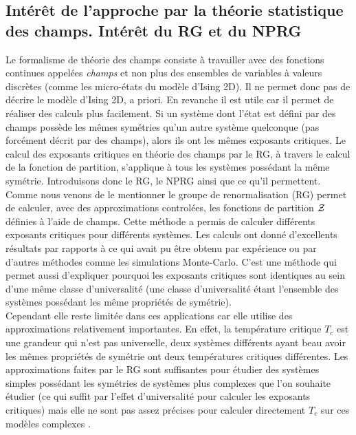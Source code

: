\documentclass[10.5pt]{article}
\begin{document}
\begin{multicols*}{2}
\subsection{Intérêt de l'approche par la théorie statistique des champs. Intérêt du RG et du NPRG}


Le formalisme de théorie des champs consiste à travailler avec des fonctions continues appelées \textit{champs} et non plus des ensembles de variables à valeurs discrètes (comme les micro-états du modèle d'Ising 2D). Il ne permet donc pas de décrire le modèle d'Ising 2D, a priori. En revanche il est utile car il permet de réaliser des calculs plus facilement. Si un système dont l'état est défini par des champs possède les mêmes symétries qu'un autre système quelconque (pas forcément décrit par des champs), alors ils ont les mêmes exposants critiques. Le calcul des exposants critiques en théorie des champs par le RG, à travers le calcul de la fonction de partition, s'applique à tous les systèmes possédant la même symétrie. Introduisons donc le RG, le NPRG ainsi que ce qu'il permettent. \\

Comme nous venons de le mentionner le groupe de renormalisation (RG) permet de calculer, avec des approximations controlées, les fonctions de partition $\mathcal{Z}$ définies à l'aide de champs. Cette méthode a permis de calculer différents exposants critiques pour différents systèmes. Les calculs ont donné d'excellents résultats \cite{kadanoff1967scaling, wilson1971renormalization2} par rapports à ce qui avait pu être obtenu par expérience ou par d'autres méthodes comme les simulations Monte-Carlo. C'est une méthode qui permet aussi d'expliquer pourquoi les exposants critiques sont identiques au sein d'une même classe d'universalité (une classe d'universalité étant l'ensemble des systèmes possédant les même propriétés de symétrie). \\
\indent
Cependant elle reste limitée dans ces applications car elle utilise des approximations relativement importantes. En effet, la température critique $T_c$ est une grandeur qui n'est pas universelle, deux systèmes différents ayant beau avoir les mêmes propriétés de symétrie ont deux températures critiques différentes. Les approximations faites par le RG sont suffisantes pour étudier des systèmes simples possédant les symétries de systèmes plus complexes que l'on souhaite étudier (ce qui suffit par l'effet d'universalité pour calculer les exposants critiques) mais elle ne sont pas assez précises pour calculer directement $T_c$ sur ces modèles complexes .\\


\end{multicols*}
\end{document}
